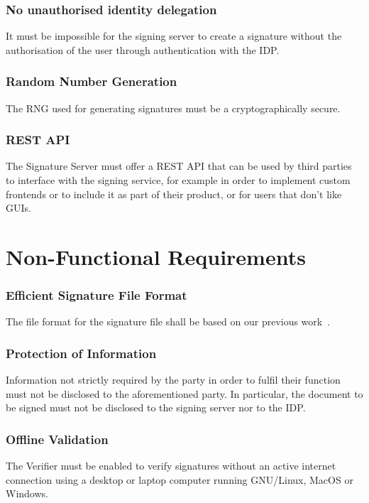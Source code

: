 \subsection{No unauthorised identity delegation}
It must be impossible for the signing server to create a signature without the authorisation of the user through authentication with the \gls{IDP}.

\subsection{Random Number Generation}
The \gls{RNG} used for generating signatures must be a cryptographically secure.

\subsection{REST API}
The Signature Server must offer a \gls{REST} \gls{API} that can be used by third parties to interface with the signing service,
for example in order to implement custom frontends or to include it as part of their product,
or for users that don't like \gls{GUI}s.

\chapter*{Non-Functional Requirements}
\label{ch:nonfunctionalrequirements}

\subsection{Efficient Signature File Format}
The file format for the signature file shall be based on our previous work~\cite{projekt2}.

\subsection{Protection of Information}
Information not strictly required by the party in order to fulfil their function must not be disclosed to the aforementioned party.
In particular, the document to be signed must not be disclosed to the signing server nor to the \gls{IDP}.

\subsection{Offline Validation}
The Verifier must be enabled to verify signatures without an active internet connection using a desktop or laptop computer running GNU/Linux, MacOS or Windows.

